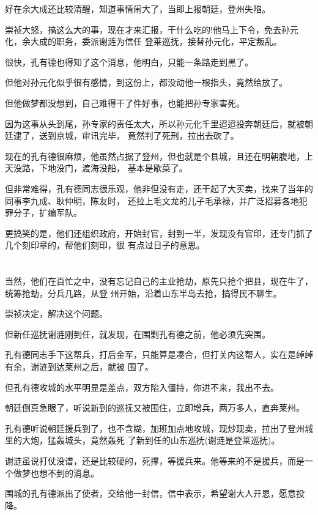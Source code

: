 \documentclass[11pt,a4paper,onecolumn]{article}
\begin{document}
好在余大成还比较清醒，知道事情闹大了，当即上报朝廷，登州失陷。

崇祯大怒，搞这么大的事，现在才来汇报，干什么吃的!他马上下令，免去孙元化，余大成的职务，委派谢涟为信任
登莱巡抚，接替孙元化，平定叛乱。

很快，孔有德也得知了这个消息，他明白，只能一条路走到黑了。

但他对孙元化似乎很有感情，到这份上，都没动他一根指头，竟然给放了。

但他做梦都没想到，自己难得干了件好事，也能把孙专家害死。

因为这事从头到尾，孙专家的责任太大，所以孙元化千里迢迢投奔朝廷后，就被朝廷逮了，送到京城，审讯完毕，
竟然判了死刑，拉出去砍了。

现在的孔有德很麻烦，他虽然占据了登州，但也就是个县城，且还在明朝腹地，上天没路，下地没门，渡海没船，
基本是歇菜了。

但非常难得，孔有德同志很乐观，他非但没有走，还干起了大买卖，找来了当年的同事李九成、耿仲明，陈友时，
还拉上毛文龙的儿子毛承禄，并广泛招募各地犯罪分子，扩编军队。

更搞笑的是，他们还组织政府，开始封官，封到一半，发现没有官印，还专门抓了几个刻印章的，帮他们刻印，很
有点过日子的意思。

\section[\thesection]{}

当然，他们在百忙之中，没有忘记自己的主业\myrule 抢劫，原先只抢个把县，现在牛了，统筹抢劫，分兵几路，从登
州开始，沿着山东半岛去抢，搞得民不聊生。

崇祯决定，解决这个问题。

但新任巡抚谢涟刚到任，就发现，在围剿孔有德之前，他必须先突围。

孔有德同志手下这帮兵，打后金军，只能算是凑合，但打关内这帮人，实在是绰绰有余，谢涟到达莱州之后，就被
围了。

但孔有德攻城的水平明显是差点，双方陷入僵持，你进不来，我出不去。

朝廷倒真急眼了，听说新到的巡抚又被围住，立即增兵，两万多人，直奔莱州。

孔有德听说朝廷援兵到了，也不含糊，加班加点地攻城，现炒现卖，拉出了登州城里的大炮，猛轰城头，竟然轰死
了新到任的山东巡抚(谢涟是登莱巡抚)。

谢涟虽说打仗没谱，还是比较硬的，死撑，等援兵来。他等来的不是援兵，而是一个做梦也想不到的消息。

围城的孔有德派出了使者，交给他一封信，信中表示，希望谢大人开恩，愿意投降。
\end{document}
